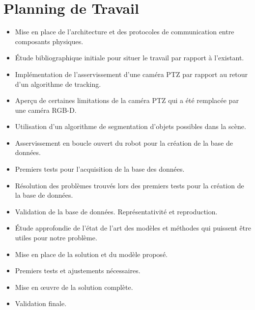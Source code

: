 \section{Planning de Travail}
\begin{itemize}
\item[\checkmark] Mise en place de l'architecture et des protocoles de communication entre composants physiques.
\item[\checkmark] Étude bibliographique initiale pour situer le travail par rapport à l'existant.
\item[\checkmark] Implémentation de l'asservissement d'une caméra PTZ par rapport au retour d'un algorithme de tracking.
\item[\checkmark] Aperçu de certaines limitations de la caméra PTZ qui a été remplacée par une caméra RGB-D.
\item[\checkmark] Utilisation d'un algorithme de segmentation d'objets possibles dans la scène.
\item[\checkmark] Asservissement en boucle ouvert du robot pour la création de la base de données.
\item[\checkmark] Premiers tests pour l'acquisition de la base des données.
\item Résolution des problèmes trouvés lors des premiers tests pour la création de la base de données.
\item Validation de la base de données. Représentativité et reproduction.
\item Étude approfondie de l’état de l'art des modèles et méthodes qui puissent être utiles pour notre problème.
\item Mise en place de la solution et du modèle proposé.
\item Premiers tests et ajustements nécessaires.
\item Mise en œuvre de la solution complète.
\item Validation finale.    
\end{itemize}
